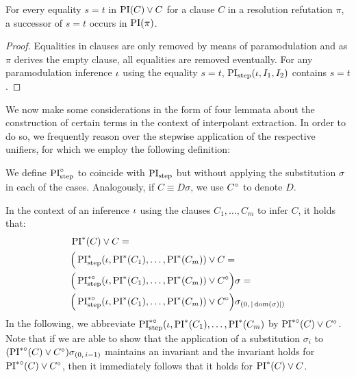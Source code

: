 \documentclass[,%
	draft=false,%
	numbers=noendperiod
	12pt,
	a4paper,
	oneside,%
	openany,
]{memoir}
\newcommand{\inv}{\ensuremath{\PIstarnosigma(C)\lor C\nosigma}}
\newcommand{\invp}{\ensuremath{(\inv)}}
\begin{document}
\begin{lemma}
	\label{lemma:equalities_all_in_PI}
	For every equality $s=t$ in $\operatorname{PI}(C) \lor C$ for a clause $C$ in a resolution refutation $\pi$,
	a successor of $s=t$ occurs in $\operatorname{PI}(\pi)$.
\end{lemma}
\begin{proof}
	Equalities in clauses are only removed by means of paramodulation and as $\pi$ derives the empty clause, all equalities are removed eventually.
	For any paramodulation inference $\iota$ using the equality $s=t$, $\operatorname{PI}_{\mathrm{step}}(\iota, I_1, I_2)$ contains $s=t$. 
\end{proof}


We now make some considerations in the form of four lemmata about the construction of certain terms in the context of interpolant extraction.
In order to do so, we frequently reason over the stepwise application of the respective unifiers, for which we employ the following definition:

\begin{defi}
	We define $\operatorname{PI}^{\circ}_{\mathrm{step}}$ to coincide with $\operatorname{PI}_{\mathrm{step}}$ but without applying the substitution $\sigma$ in each of the cases.
	Analogously, if $C \equiv D\sigma$, we use $C^\circ$ to denote\nolinebreak{} $D$.
\end{defi}

In the context of an inference $\iota$ using the clauses $C_1, \dots, C_m$ to infer $C$, it holds that:
\begin{align*}
	& \operatorname{PI}^*(C) \lor C = \\
	& \Big(\operatorname{PI}_{\mathrm{step}}^*(\iota, \operatorname{PI}^*(C_1), \dots, \operatorname{PI}^*(C_m)) \lor C = \\
	& \Big(\operatorname{PI}^{*\circ}_{\mathrm{step}}(\iota, \operatorname{PI}^*(C_1), \dots, \operatorname{PI}^*(C_m)) \lor C^\circ \Big) \sigma = \\
	& \Big(\operatorname{PI}^{*\circ}_{\mathrm{step}}(\iota, \operatorname{PI}^*(C_1), \dots, \operatorname{PI}^*(C_m)) \lor C^\circ \Big) \sigma_{(0,\,|\operatorname{dom}(\sigma)|)}
\end{align*}
In the following, we abbreviate
$\operatorname{PI}^{*\circ}_{\mathrm{step}}(\iota, \operatorname{PI}^*(C_1), \dots, \operatorname{PI}^*(C_m)$
by $\inv$.
Note that if we are able to show that the application of a substitution $\sigma_i$ to $\invp\sigmazmi$ maintains an invariant and the invariant holds for $\inv$, then it immediately follows that it holds for $\operatorname{PI}^*(C) \lor C$. 
\end{document}

